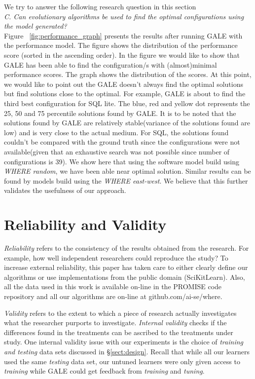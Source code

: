 \documentclass{sig-alternative}
\newcommand{\tion}[1]{\S\ref{sect:#1}}
\begin{document}
We try to answer the following research question in this section\\

\textit{C. Can evolutionary algorithms be used to find the optimal
configurations using the model generated?}
\\
Figure ~\ref{fig:performance_graph} presents the results after running GALE with the performance model. The figure shows the distribution of the performance score (sorted in the ascending order). In the figure we would like to show that GALE has been able to find the configuration/s with (almost)minimal performance scores. The graph shows the distribution of the scores.  At this point, we would like to point out the GALE doesn't always find the optimal solutions but find solutions close to the optimal. For example, GALE is about to find the third best configuration for SQL lite. The blue, red and yellow dot represents the 25, 50 and 75 percentile solutions found by GALE. It is to be noted that the solutions found by GALE are relatively stable(variance of the solutions found are low) and is very close to the actual medium. For SQL, the solutions found couldn't be compared with the ground truth since the configurations were not available(given that an exhaustive search was not possible since number of configurations is 39). We show here that using the software model build using \textit{WHERE random}, we have been able near optimal solution. Similar results can be found by models build using the \textit{WHERE east-west}. We believe that this further validates the usefulness of our approach.  


 
 
\section{Reliability and Validity}\label{sect:construct}


{\em Reliability} refers to the consistency of the results obtained
from the research.  For example,   how well independent researchers
could reproduce the study? To increase external
reliability, this paper has taken care to either  clearly define our
algorithms or use implementations from the public domain
(SciKitLearn). Also, all the data used in this work is available
on-line in the PROMISE code repository and all our algorithms
are on-line at github.com/ai-se/where.


{\em Validity} refers to the extent to which a piece of research actually
investigates what the researcher purports to investigate.
{\em Internal validity} checks if the differences found in
the treatments can be ascribed to the treatments under study. 
One internal validity issue with our experiments is the choice
of {\em training and testing} data sets discussed in 
\tion{design}. Recall that while all our learners used the same
{\em testing} data set, our untuned learners were only given
access to {\em training} while GALE could get feedback from
{\em training} and
{\em tuning}.  
\end{document}
